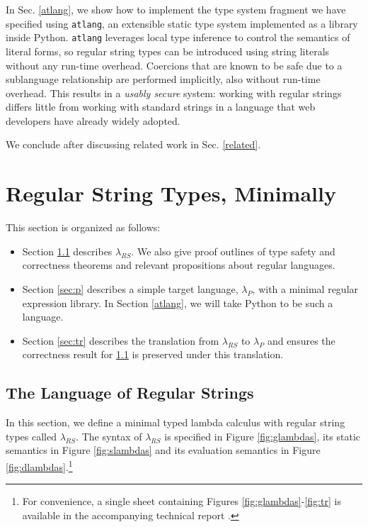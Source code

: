 \documentclass[9pt]{sig-alternate}
\theoremstyle{definition}
\newcommand{\lambdas}{\lambda_{RS}}
\newcommand{\lambdap}{\lambda_P}
\begin{document}
In Sec. \ref{atlang}, we show how to implement the type system fragment we have specified  using \texttt{atlang}, an extensible static type system implemented as a library inside Python. \texttt{atlang} leverages local type inference to control the semantics of literal forms, so regular string types can be introduced using string literals without any run-time overhead. Coercions that are known to be  safe due to a sublanguage relationship are performed implicitly, also without run-time overhead. This results in a \emph{usably secure} system: working with regular strings differs little from working with standard strings in a language that web developers have already widely adopted.

We conclude after discussing related work in Sec. \ref{related}.

\section{Regular String Types, Minimally}\label{calculus}
\noindent
This section is organized as follows:
\begin{itemize}
\item Section \ref{sec:rs} describes $\lambda_{RS}$. We also give proof outlines of  type safety and correctness theorems and relevant propositions about regular languages.
\item Section \ref{sec:p} describes a simple target language, $\lambdap$, with a minimal regular expression library. In Section \ref{atlang}, we will take Python to be such a language.
\item Section \ref{sec:tr} describes the translation from $\lambdas$ to $\lambdap$ and ensures the correctness result for \ref{sec:rs} is preserved under this translation. 
\end{itemize}

\subsection{The Language of Regular Strings}\label{sec:rs}
In this section, we define a minimal typed lambda calculus with regular string types called $\lambda_{RS}$. The syntax of $\lambda_{RS}$ is specified in Figure \ref{fig:glambdas}, its static semantics in Figure \ref{fig:slambdas} and its evaluation semantics in Figure \ref{fig:dlambdas}.\footnote{For convenience, a single sheet containing Figures \ref{fig:glambdas}-\ref{fig:tr} is available in the accompanying technical report \cite{psptr}.}
\end{document}
